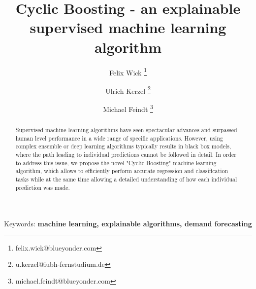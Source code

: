 \documentclass[BCOR=1mm, DIV=calc,10pt,
twoside=true,
twocolumn,
headings=normal]{scrartcl}
\begin{document}
\title{Cyclic Boosting - an explainable supervised machine learning algorithm}


\author[1]{Felix Wick \thanks{felix.wick@blueyonder.com}}
\author[2]{Ulrich Kerzel \thanks{u.kerzel@iubh-fernstudium.de}}
\author[1]{Michael Feindt \thanks{michael.feindt@blueyonder.com}}


\date{}

\maketitle


\begin{abstract}
Supervised machine learning algorithms have seen spectacular advances and surpassed human
level performance in a wide range of specific applications. However, using complex
ensemble or deep learning algorithms typically results in black box models, where the path
leading to individual predictions cannot be followed in detail. In order to address this
issue, we propose the novel "Cyclic Boosting" machine learning algorithm, which allows to
efficiently perform accurate regression and classification tasks while at the same time
allowing a detailed understanding of how each individual prediction was made.
\end{abstract}

{Keywords: \textbf{machine learning, explainable algorithms, demand forecasting}}
\end{document}

